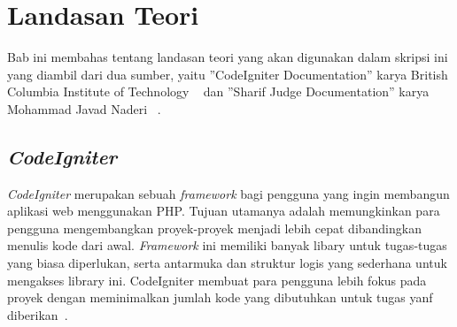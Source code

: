 \chapter{Landasan Teori}
\label{chap:teori}

Bab ini membahas tentang landasan teori yang akan digunakan dalam skripsi ini yang diambil dari dua sumber, yaitu ''CodeIgniter Documentation'' karya British Columbia Institute of Technology ~\cite{bcit:17:cidoc} dan ''Sharif Judge Documentation'' karya Mohammad Javad Naderi ~\cite{mjnaderi:14:sharifjudgedoc}.

\section{\textit{CodeIgniter}}
\label{sec:codeigniter} 
 
\textit{CodeIgniter} merupakan sebuah \textit{framework} bagi pengguna yang ingin membangun aplikasi web menggunakan PHP. Tujuan utamanya adalah memungkinkan para pengguna mengembangkan proyek-proyek menjadi lebih cepat dibandingkan menulis kode dari awal. \textit{Framework} ini memiliki banyak libary untuk tugas-tugas yang biasa diperlukan, serta antarmuka dan struktur logis yang sederhana untuk mengakses library ini. CodeIgniter membuat para pengguna lebih fokus pada proyek dengan meminimalkan jumlah kode yang dibutuhkan untuk tugas yanf diberikan~\cite{bcit:17:cidoc}. \\

